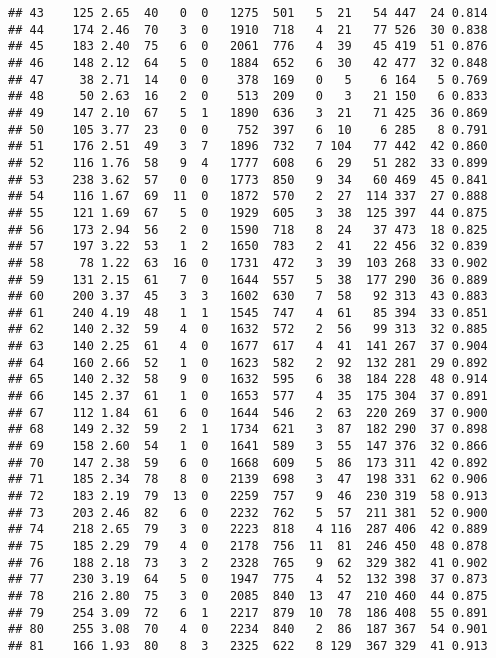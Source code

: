 \documentclass[]{article}
\begin{document}
\begin{verbatim}
## 43    125 2.65  40   0  0   1275  501   5  21   54 447  24 0.814
## 44    174 2.46  70   3  0   1910  718   4  21   77 526  30 0.838
## 45    183 2.40  75   6  0   2061  776   4  39   45 419  51 0.876
## 46    148 2.12  64   5  0   1884  652   6  30   42 477  32 0.848
## 47     38 2.71  14   0  0    378  169   0   5    6 164   5 0.769
## 48     50 2.63  16   2  0    513  209   0   3   21 150   6 0.833
## 49    147 2.10  67   5  1   1890  636   3  21   71 425  36 0.869
## 50    105 3.77  23   0  0    752  397   6  10    6 285   8 0.791
## 51    176 2.51  49   3  7   1896  732   7 104   77 442  42 0.860
## 52    116 1.76  58   9  4   1777  608   6  29   51 282  33 0.899
## 53    238 3.62  57   0  0   1773  850   9  34   60 469  45 0.841
## 54    116 1.67  69  11  0   1872  570   2  27  114 337  27 0.888
## 55    121 1.69  67   5  0   1929  605   3  38  125 397  44 0.875
## 56    173 2.94  56   2  0   1590  718   8  24   37 473  18 0.825
## 57    197 3.22  53   1  2   1650  783   2  41   22 456  32 0.839
## 58     78 1.22  63  16  0   1731  472   3  39  103 268  33 0.902
## 59    131 2.15  61   7  0   1644  557   5  38  177 290  36 0.889
## 60    200 3.37  45   3  3   1602  630   7  58   92 313  43 0.883
## 61    240 4.19  48   1  1   1545  747   4  61   85 394  33 0.851
## 62    140 2.32  59   4  0   1632  572   2  56   99 313  32 0.885
## 63    140 2.25  61   4  0   1677  617   4  41  141 267  37 0.904
## 64    160 2.66  52   1  0   1623  582   2  92  132 281  29 0.892
## 65    140 2.32  58   9  0   1632  595   6  38  184 228  48 0.914
## 66    145 2.37  61   1  0   1653  577   4  35  175 304  37 0.891
## 67    112 1.84  61   6  0   1644  546   2  63  220 269  37 0.900
## 68    149 2.32  59   2  1   1734  621   3  87  182 290  37 0.898
## 69    158 2.60  54   1  0   1641  589   3  55  147 376  32 0.866
## 70    147 2.38  59   6  0   1668  609   5  86  173 311  42 0.892
## 71    185 2.34  78   8  0   2139  698   3  47  198 331  62 0.906
## 72    183 2.19  79  13  0   2259  757   9  46  230 319  58 0.913
## 73    203 2.46  82   6  0   2232  762   5  57  211 381  52 0.900
## 74    218 2.65  79   3  0   2223  818   4 116  287 406  42 0.889
## 75    185 2.29  79   4  0   2178  756  11  81  246 450  48 0.878
## 76    188 2.18  73   3  2   2328  765   9  62  329 382  41 0.902
## 77    230 3.19  64   5  0   1947  775   4  52  132 398  37 0.873
## 78    216 2.80  75   3  0   2085  840  13  47  210 460  44 0.875
## 79    254 3.09  72   6  1   2217  879  10  78  186 408  55 0.891
## 80    255 3.08  70   4  0   2234  840   2  86  187 367  54 0.901
## 81    166 1.93  80   8  3   2325  622   8 129  367 329  41 0.913

\end{verbatim}
\end{document}
